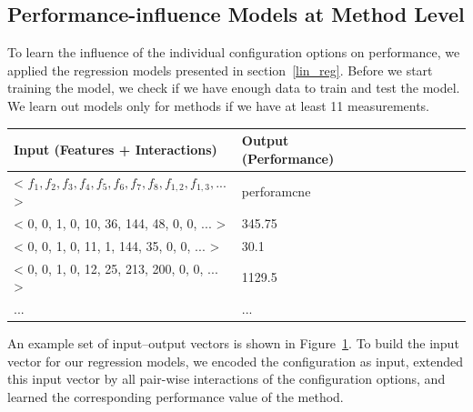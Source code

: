 

\subsection{Performance-influence Models at Method Level}
\label{perf_infl_models_m_lvl}

To learn the influence of the individual configuration options on performance, we applied the regression models presented in section~\ref{lin_reg}. Before we start training the model, we check if we have enough data to train and test the model. We learn out models only for methods if we have at least 11 measurements. 

\begin{table}[h]
	\centering %
    \begin{tabular}{*{9}{l}}

        Input (Features + Interactions) & Output (Performance) \\
        \toprule

        < $f_1, f_2, f_3, f_4, f_5, f_6, f_7, f_8, f_{1,2}, f_{1,3}, ...$> & perforamcne \\
       
        < 0, 0, 1, 0, 10, 36, 144, 48, 0, 0, ... > & 345.75 \\
		< 0, 0, 1, 0, 11, 1, 144, 35, 0, 0, ... > & 30.1 \\
		< 0, 0, 1, 0, 12, 25, 213, 200, 0, 0, ... > & 1129.5 \\
		... & ...\\

    \end{tabular}
    \label{table:example:inp_outp}
\end{table}

An example set of input--output vectors is shown in Figure~\ref{table:example:inp_outp}. To build the input vector for our regression models, we encoded the configuration as input, extended this input vector by all pair-wise interactions of the configuration options, and learned the corresponding performance value of the method.


